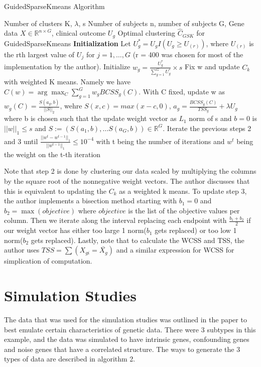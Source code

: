 \documentclass{statsoc}
\newcommand{\RR}{\mathbb{R}}
\begin{document}
\begin{algorithm}
    \caption{GuidedSparseKmeans Algorithm}
    \begin{algorithmic}[1]
        \REQUIRE Number of clusters K, $\lambda$, s
        \INPUT Number of subjects n, number of subjects G, Gene data $X \in \RR^{n\times G}$, clinical outcome $U_g$
        \OUTPUT Optimal clustering $\hat{C}_{GSK}$ for GuidedSparseKmeans
        \STATE \textbf{Initialization} Let $U_g^* = U_g I(U_g \geq U_{(r)})$, where $U_{(r)}$ is the rth largest value of $U_j$ for $j = 1,\ldots, G$ (r = 400 was chosen for most of the implementation by the author). Initialize $w_g = \frac{U_g^*}{\sum_{g=1}^G U_g^*} \times s$
        \STATE Fix w and update $C_k$ with weighted K means. Namely we have $C(w) = \arg \max_C \sum_{g=1}^G w_g BCSS_g(C)$. 
        \STATE With C fixed, update w as $w_g(C) = \frac{S(a_g, b)}{||S||_2}$, wehre $S(x,c) = max(x-c, 0)$, $a_g = \frac{BCSS_g(C)}{TSS_g} + \lambda U_g$ where b is chosen such that the update weight vector as $L_1$ norm of s and $b=0$ is $||w||_1 \leq s$ and $S := (S(a_1,b), \ldots S(a_G, b)) \in \RR^G$. 
        \STATE Iterate the previous steps 2 and 3 until $\frac{||w^t - w^{t-1}||_1}{||w^{t-1}||_1} \leq 10^{-4}$ with t being the number of iterations and $w^t$ being the weight on the t-th iteration   
    \end{algorithmic}
\end{algorithm}

Note that step 2 is done by clustering our data scaled by multiplying the columns by the square root of the nonnegative weight vectors. The author discusses that this is equivalent to updating the $C_k$ as a weighted k means. To update step 3, the author implements a bisection method starting with $b_1 = 0$ and $b_2 = \max(objective)$ where $objective$ is the list of the objective values per column. Then we iterate along the interval replacing each endpoint with $\frac{b_1+b_2}{2}$ if our weight vector has either too large 1 norm($b_1$ gets replaced) or too low 1 norm($b_2$ gets replaced). Lastly, note that to calculate the WCSS and TSS, the author uses $TSS = \sum (X_{gi} = \bar{X_g})$ and a similar expression for WCSS for simplication of computation. 


\section{Simulation Studies}

The data that was used for the simulation studies was outlined in the paper to best emulate certain characteristics of genetic data. There were 3 subtypes in this example, and the data was simulated to have intrinsic genes, confounding genes and noise genes that have a correlated structure. The ways to generate the 3 types of data are described in algorithm 2. 
\end{document}
